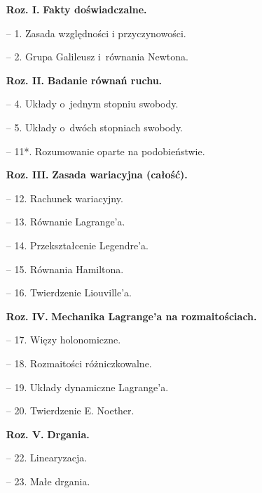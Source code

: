 \documentclass[a4paper,11pt]{article}
\begin{document}
\begin{itemize}
\item[\textbf{Roz. I.}] \textbf{Fakty doświadczalne.}

\item[--] 1. Zasada względności i przyczynowości.

\item[--] 2. Grupa Galileusz i~równania Newtona.


\item[\textbf{Roz. II.}] \textbf{Badanie równań ruchu.}

\item[--] 4. Układy o~jednym stopniu swobody.

\item[--] 5. Układy o~dwóch stopniach swobody.

\item[--] 11*. Rozumowanie oparte na podobieństwie.


\item[\textbf{Roz. III.}] \textbf{Zasada wariacyjna (całość).}

\item[--] 12. Rachunek wariacyjny.

\item[--] 13. Równanie Lagrange'a.

\item[--] 14. Przekształcenie Legendre'a.

\item[--] 15. Równania Hamiltona.

\item[--] 16. Twierdzenie Liouville'a.


\item[\textbf{Roz. IV.}] \textbf{Mechanika Lagrange'a na
    rozmaitościach.}

\item[--] 17. Więzy holonomiczne.

\item[--] 18. Rozmaitości różniczkowalne.

\item[--] 19. Układy dynamiczne Lagrange'a.

\item[--] 20. Twierdzenie E. Noether.


\item[\textbf{Roz. V.}] \textbf{Drgania.}

\item[--] 22. Linearyzacja.

\item[--] 23. Małe drgania.


\end{itemize}
\end{document}
